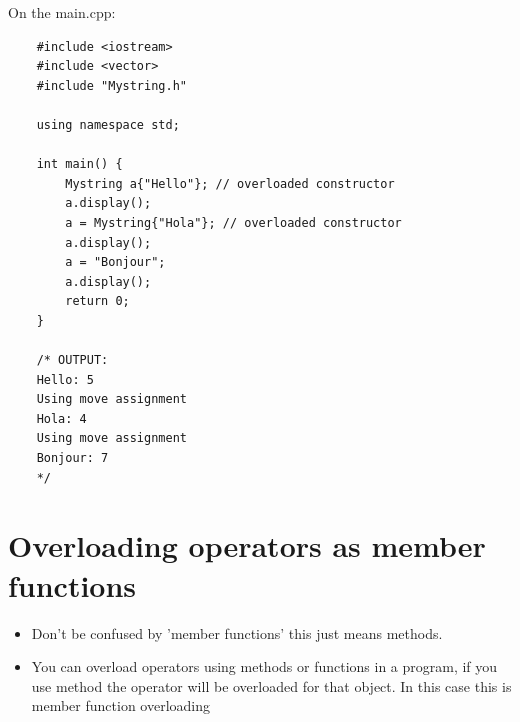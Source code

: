 On the main.cpp:
\begin{verbatim}
    #include <iostream>
    #include <vector>
    #include "Mystring.h"

    using namespace std;

    int main() {
        Mystring a{"Hello"}; // overloaded constructor
        a.display();
        a = Mystring{"Hola"}; // overloaded constructor 
        a.display();
        a = "Bonjour";
        a.display();
        return 0;
    }

    /* OUTPUT:
    Hello: 5
    Using move assignment
    Hola: 4
    Using move assignment
    Bonjour: 7
    */
\end{verbatim}


\section{Overloading operators as member functions}
\begin{itemize}
    \item Don't be confused by 'member functions' this just means methods. 
    \item You can overload operators using methods or functions in a program, if you use method the operator will be overloaded for that object. In this case this is member function overloading
\end{itemize}

